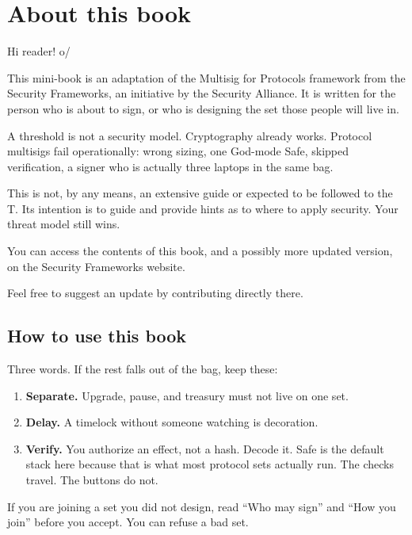 \chapter{About this book}

Hi reader! o/

This mini-book is an adaptation of the Multisig for
Protocols framework from the Security Frameworks, an
initiative by the Security Alliance. It is written for
the person who is about to sign, or who is designing
the set those people will live in.

A threshold is not a security model. Cryptography
already works. Protocol multisigs fail operationally:
wrong sizing, one God-mode Safe, skipped verification,
a signer who is actually three laptops in the same
bag.

This is not, by any means, an extensive guide or
expected to be followed to the T. Its intention is to
guide and provide hints as to where to apply security.
Your threat model still wins.

You can access the contents of this book, and a
possibly more updated version, on the Security
Frameworks website.

Feel free to suggest an update by contributing
directly there.

\section{How to use this book}

Three words. If the rest falls out of the bag, keep
these:

\begin{enumerate}
  \item \textbf{Separate.} Upgrade, pause, and treasury
  must not live on one set.
  \item \textbf{Delay.} A timelock without someone
  watching is decoration.
  \item \textbf{Verify.} You authorize an effect, not
  a hash. Decode it. Safe is the default stack here
  because that is what most protocol sets actually
  run. The checks travel. The buttons do not.
\end{enumerate}

If you are joining a set you did not design, read
``Who may sign'' and ``How you join'' before you
accept. You can refuse a bad set.

